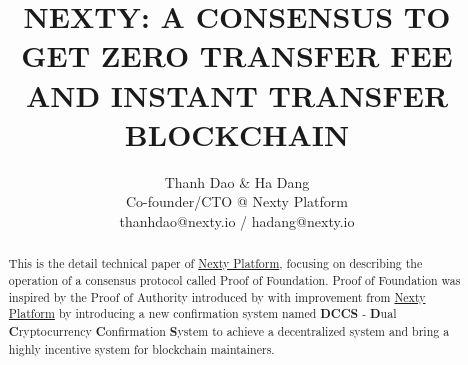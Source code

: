 \documentclass[12pt,oneside]{amsart}
\title{NEXTY: A CONSENSUS TO GET ZERO TRANSFER FEE AND INSTANT TRANSFER BLOCKCHAIN}
\author{
	Thanh Dao \& Ha Dang \\
	Co-founder/CTO @ Nexty Platform \\
	thanhdao@nexty.io / hadang@nexty.io
}
\date{} %
\begin{document}
\pagecolor{pagecolor}
\begin{abstract}
This is the detail technical paper of \href{https://nexty.io}{Nexty Platform}, focusing on describing the operation of a consensus protocol called Proof of Foundation. Proof of Foundation was inspired by the Proof of Authority introduced by \cite{clique} with improvement from \href{https://nexty.io}{Nexty Platform} by introducing a new confirmation system named \textbf{DCCS} - \textbf{D}ual \textbf{C}ryptocurrency \textbf{C}onfirmation \textbf{S}ystem to achieve a decentralized system and bring a highly incentive system for blockchain maintainers.
\end{abstract}

\maketitle
\end{document}
